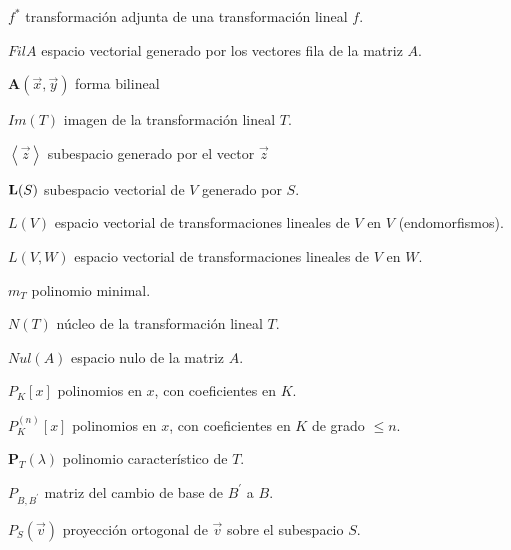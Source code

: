 \documentclass[a4paper,12pt,twopage]{book}
\begin{document}
 $f ^{*}$ transformación adjunta de una transformación lineal $f$. 
 
\vspace{0.2cm}

$Fil A$  espacio vectorial generado por los vectores fila de la matriz $A$.

\vspace{0.2cm}

$\mathbf{A}(\vec{x},\vec{y})$  forma bilineal

\vspace{0.2cm}

$Im(T)$  imagen de la transformación lineal $T$.

\vspace{0.2cm}

$\left\langle \vec{z}\right\rangle $ subespacio generado por el vector $\vec{z}$

\vspace{0.2cm}

$\bold{L}(S)$  subespacio vectorial de $V$ generado por $S$. 
\vspace{0.2cm}

$L(V)$    espacio vectorial de transformaciones lineales de $V$ en $V$ (endomorfismos).
\vspace{0.2cm}

$L(V,W) $  espacio vectorial de transformaciones lineales de $V$ en $W$.
\vspace{0.2cm}

$m_T$  polinomio minimal.
\vspace{0.2cm}

$N(T)$  núcleo de la transformación lineal $T$.
\vspace{0.2cm}

$Nul(A)$  espacio nulo de la matriz $A$.
\vspace{0.2cm}

$ P_{K} \left[ x \right]$ polinomios en  $x$, con coeficientes en $K$.
\vspace{0.2cm}

$ P^{(n)}_K\left[x\right]$ polinomios en  $x$, con coeficientes en $K$ de grado $\le n$.
\vspace{0.2cm}

$\mathbf{P}_T(\lambda)$  polinomio característico de $T$.
\vspace{0.2cm}

$P_{B,B ^{\prime}}$  matriz del cambio de base de  $B ^{\prime}$  a $B$.
\vspace{0.2cm}


$P_S(\vec{v})$ proyección ortogonal de $\vec{v}$ sobre el subespacio $S$. 
\vspace{0.2cm}
\end{document}
